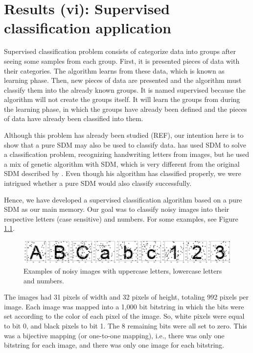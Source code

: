 
\chapter{Results (vi): Supervised classification application}

Supervised classification problem consists of categorize data into groups after seeing some samples from each group. First, it is presented pieces of data with their categories. The algorithm learns from these data, which is known as learning phase. Then, new pieces of data are presented and the algorithm must classify them into the already known groups. It is named supervised because  the algorithm will not create the groups itself. It will learn the groups from during the learning phase, in which the groups have already been defined and the pieces of data have already been classified into them.

Although this problem has already been studied (REF), our intention here is to show that a pure SDM may also be used to classify data. \citet{fan1997genetic} has used SDM to solve a classification problem, recognizing handwriting letters from images, but he used a mix of genetic algorithm with SDM, which is very different from the original SDM described by \cite{Kanerva1988}. Even though his algorithm has classified properly, we were intrigued whether a pure SDM would also classify successfully.

Hence, we have developed a supervised classification algorithm based on a pure SDM as our main memory. Our goal was to classify noisy images into their respective letters (case sensitive) and numbers. For some examples, see Figure \ref{fig-classification-examples}.

\begin{figure}[!htb]
\centering\includegraphics[width=\textwidth]{./images02/classification/example.png}
\caption{Examples of noisy images with uppercase letters, lowercase letters and numbers.
\label{fig-classification-examples}}
\end{figure}

The images had 31 pixels of width and 32 pixels of height, totaling 992 pixels per image. Each image was mapped into a 1,000 bit bitstring in which the bits were set according to the color of each pixel of the image. So, white pixels were equal to bit 0, and black pixels to bit 1. The 8 remaining bits were all set to zero. This was a bijective mapping (or one-to-one mapping), i.e., there was only one bitstring for each image, and there was only one image for each bitstring.

